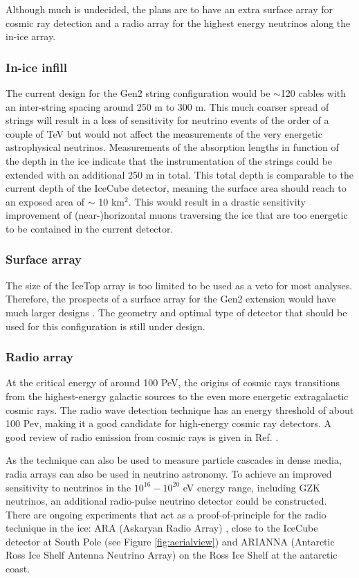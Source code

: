 Although much is undecided, the plans are to have an extra surface array for cosmic ray detection and a radio array for the highest energy neutrinos along the in-ice array.\\

\subsubsection{In-ice infill}
The current design for the Gen2 string configuration would be $\sim$120 cables with an inter-string spacing around 250 m to 300 m. This much coarser spread of strings will result in a loss of sensitivity for neutrino events of the order of a couple of TeV but would not affect the measurements of the very energetic astrophysical neutrinos. Measurements of the absorption lengths in function of the depth in the ice indicate that the instrumentation of the strings could be extended with an additional 250 m in total. This total depth is comparable to the current depth of the IceCube detector, meaning the surface area should reach to an exposed area of $\sim$ 10 km$^2$. This would result in a drastic sensitivity improvement of (near-)horizontal muons traversing the ice that are too energetic to be contained in the current detector.
\subsubsection{Surface array}
The size of the IceTop array is too limited to be used as a veto for most analyses. Therefore, the prospects of a surface array for the Gen2 extension would have much larger designs \cite{Euler:2015oen}. The geometry and optimal type of detector that should be used for this configuration is still under design.
\subsubsection{Radio array}
\label{subsub:radio}
At the critical energy of around 100 PeV, the origins of cosmic rays transitions from the highest-energy galactic sources to the even more energetic extragalactic cosmic rays. The radio wave detection technique has an energy threshold of about 100 Pev, making it a good candidate for high-energy cosmic ray detectors. A good review of radio emission from cosmic rays is given in Ref. \cite{Schroder:2016hrv}.

As the technique can also be used to measure particle cascades in dense media, radia arrays can also be used in neutrino astronomy. To achieve an improved sensitivity to neutrinos in the $10^{16} - 10^{20}$ eV energy range, including GZK neutrinos, an additional radio-pulse neutrino detector could be constructed. There are ongoing experiments that act as a proof-of-principle for the radio technique in the ice: ARA (Askaryan Radio Array) \cite{Allison:2015eky}, close to the IceCube detector at South Pole (see Figure \ref{fig:aerialview}) and ARIANNA (Antarctic Ross Ice Shelf Antenna Neutrino Array) \cite{Glaser:2018ifj} on the Ross Ice Shelf at the antarctic coast.



